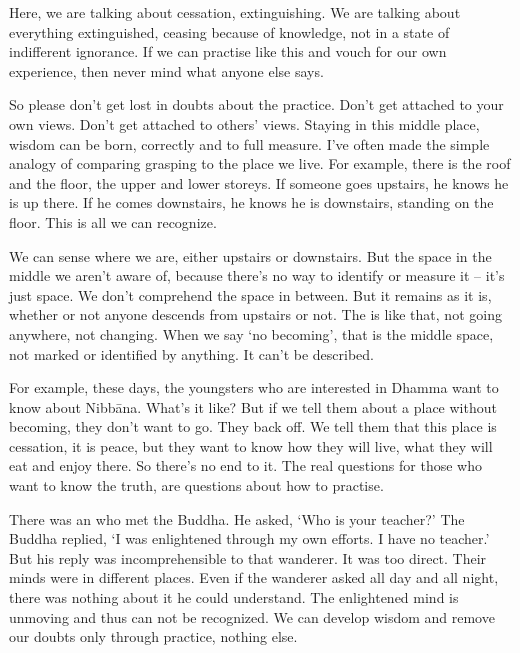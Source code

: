 Here, we are talking about cessation, extinguishing. We are talking about everything extinguished, ceasing because of knowledge, not in a state of indifferent ignorance. If we can practise like this and vouch for our own experience, then never mind what anyone else says.

So please don't get lost in doubts about the practice. Don't get attached to your own views. Don't get attached to others' views. Staying in this middle place, wisdom can be born, correctly and to full measure. I've often made the simple analogy of comparing grasping to the place we live. For example, there is the roof and the floor, the upper and lower storeys. If someone goes upstairs, he knows he is up there. If he comes downstairs, he knows he is downstairs, standing on the floor. This is all we can recognize.

We can sense where we are, either upstairs or downstairs. But the space in the middle we aren't aware of, because there's no way to identify or measure it -- it's just space. We don't comprehend the space in between. But it remains as it is, whether or not anyone descends from upstairs or not. The  is like that, not going anywhere, not changing. When we say `no becoming', that is the middle space, not marked or identified by anything. It can't be described.

For example, these days, the youngsters who are interested in Dhamma want to know about Nibb\=ana. What's it like? But if we tell them about a place without becoming, they don't want to go. They back off. We tell them that this place is cessation, it is peace, but they want to know how they will live, what they will eat and enjoy there. So there's no end to it. The real questions for those who want to know the truth, are questions about how to practise.

There was an  who met the Buddha. He asked, `Who is your teacher?' The Buddha replied, `I was enlightened through my own efforts. I have no teacher.' But his reply was incomprehensible to that wanderer. It was too direct. Their minds were in different places. Even if the wanderer asked all day and all night, there was nothing about it he could understand. The enlightened mind is unmoving and thus can not be recognized. We can develop wisdom and remove our doubts only through practice, nothing else.

